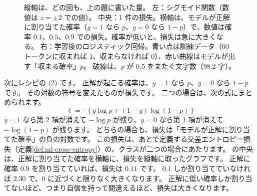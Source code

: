 \begin{figure}[tbp]
\caption{縦軸は、どの図も、上の題に書いた量。
左：シグモイド関数（数値は $z=\pm 2$ での値）。
中央：1 件の損失。横軸は、モデルが正解に割り当てた確率（$y=1$ なら $p$、$y=0$ なら $1-p$）で、数値は確率 $0.1$、$0.5$、$0.9$ での損失。確率が低いと、損失は急に大きくなる。
右：学習後のロジスティック回帰。青い点は訓練データ（60 トークンに収まれば 1、収まらなければ 0）、赤い曲線はモデルが出す「収まる確率」$p$。
破線は、$p$ が $0.5$ をまたぐ文字数（98.2 字）。}
\label{fig:ml-sigmoid}
\end{figure}

次にレシピの (2) です。
正解が起こる確率は、$y=1$ なら $p$、$y=0$ なら $1-p$ です。
その対数の符号を変えたものが損失です。
二つの場合は、次の式にまとめられます。
\begin{equation}
\ell = -\bigl\{\,y\log p + (1-y)\log(1-p)\,\bigr\}
\label{eq:ml-bce}
\end{equation}
$y=1$ なら第 2 項が消えて $-\log p$ が残り、$y=0$ なら第 1 項が消えて $-\log(1-p)$ が残ります。
どちらの場合も、損失は「モデルが正解に割り当てた確率」の負の対数です。
この損失は、あとで定義する交差エントロピー損失（定義\ref{def:ml-cross-entropy}）の、クラスが二つの場合にあたります。
の中央は、正解に割り当てた確率を横軸に、損失を縦軸に取ったグラフです。
正解に確率 $0.9$ を割り当てていれば、損失は $0.11$ です。
$0.1$ しか割り当てていなければ $2.30$ で、0 に近づくと限りなく大きくなります。
正解に低い確率しか割り当てないほど、つまり自信を持って間違えるほど、損失は大きくなります。

